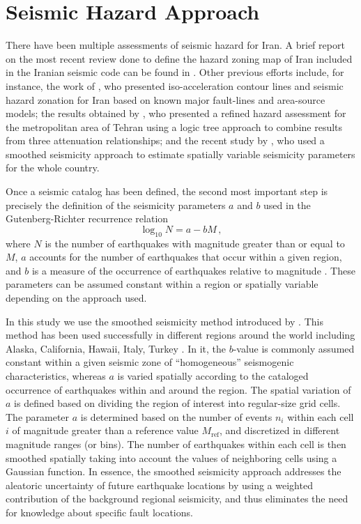 
\section{Seismic Hazard Approach}

There have been multiple assessments of seismic hazard for Iran. A brief report on the most recent review done to define the hazard zoning map of Iran included in the Iranian seismic code \citep{BHRC2014} can be found in \citet{Moinfar_2012_WCEE}. Other previous efforts include, for instance, the work of \citet{Tavakoli1999}, who presented iso-acceleration contour lines and seismic hazard zonation for Iran based on known major fault-lines and area-source models; the results obtained by \citet{Ghodrati2003}, who presented a refined hazard assessment for the metropolitan area of Tehran using a logic tree approach to combine results from three attenuation relationships; and the recent study by \citet{Khodaverdian_2016_BSSA}, who used a smoothed seismicity approach to estimate spatially variable seismicity parameters for the whole country.

Once a seismic catalog has been defined, the second most important step is precisely the definition of the seismicity parameters $a$ and $b$ used in the Gutenberg-Richter recurrence relation 
% 
\begin{equation}
	\log_{10} N = a - b M \, ,
\end{equation}
% 
\noindent
where $N$ is the number of earthquakes with magnitude greater than or equal to $M$, $a$ accounts for the number of earthquakes that occur within a given region, and $b$ is a measure of the occurrence of earthquakes relative to magnitude \citep{Gutenberg1944}. These parameters can be assumed constant within a region or spatially variable depending on the approach used. 

In this study we use the smoothed seismicity method introduced by \citet{Frankel1995}. This method has been used successfully in different regions around the world including Alaska, California, Hawaii, Italy,  Turkey . In it, the $b$-value is commonly assumed constant within a given seismic zone of ``homogeneous'' seismogenic characteristics, whereas $a$ is varied spatially according to the cataloged occurrence of earthquakes within and around the region. The spatial variation of $a$ is defined based on dividing the region of interest into regular-size grid cells. The parameter $a$ is determined based on the number of events $n_i$ within each cell $i$ of magnitude greater than a reference value $M_{\mathrm{ref}}$, and discretized in different magnitude ranges (or bins). The number of earthquakes within each cell is then smoothed spatially taking into account the values of neighboring cells using a Gaussian function. In essence, the smoothed seismicity approach addresses the aleatoric uncertainty of future earthquake locations by using a weighted contribution of the background regional seismicity, and thus eliminates the need for knowledge about specific fault locations.

